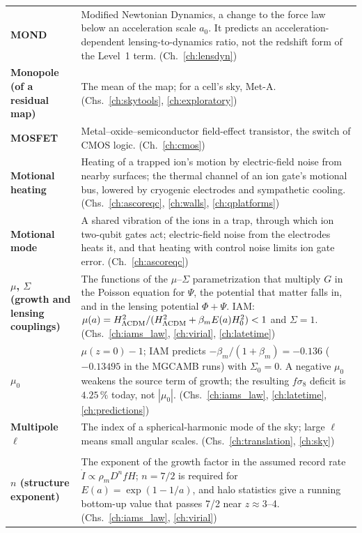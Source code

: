 {\begin{longtable}{@{}>{\raggedright\arraybackslash}p{}>{\raggedright\arraybackslash}p{}@{}}
\textbf{MOND} & Modified Newtonian Dynamics, a change to the force law below an acceleration scale $a_0$. It predicts an acceleration-dependent lensing-to-dynamics ratio, not the redshift form of the Level~1 term. {\footnotesize(Ch.~\ref{ch:lensdyn})}\\[1pt]
\textbf{Monopole (of a residual map)} & The mean of the map; for a cell's sky, Met-A. {\footnotesize(Chs.~\ref{ch:skytools}, \ref{ch:exploratory})}\\[1pt]
\textbf{MOSFET} & Metal--oxide--semiconductor field-effect transistor, the switch of CMOS logic. {\footnotesize(Ch.~\ref{ch:cmos})}\\[1pt]
\textbf{Motional heating} & Heating of a trapped ion's motion by electric-field noise from nearby surfaces; the thermal channel of an ion gate's motional bus, lowered by cryogenic electrodes and sympathetic cooling. {\footnotesize(Chs.~\ref{ch:ascoreqc}, \ref{ch:walls}, \ref{ch:qplatforms})}\\[1pt]
\textbf{Motional mode} & A shared vibration of the ions in a trap, through which ion two-qubit gates act; electric-field noise from the electrodes heats it, and that heating with control noise limits ion gate error. {\footnotesize(Ch.~\ref{ch:ascoreqc})}\\[1pt]
\textbf{$\mu$, $\Sigma$ (growth and lensing couplings)} & The functions of the $\mu$--$\Sigma$ parametrization that multiply $G$ in the Poisson equation for $\Psi$, the potential that matter falls in, and in the lensing potential $\Phi+\Psi$. IAM: $\mu(a)=H^2_{\Lambda\rm CDM}/(H^2_{\Lambda\rm CDM}+\beta_mE(a)H_0^2)<1$ and $\Sigma=1$. {\footnotesize(Chs.~\ref{ch:iams_law}, \ref{ch:virial}, \ref{ch:latetime})}\\[1pt]
\textbf{$\mu_0$} & $\mu(z{=}0)-1$; IAM predicts $-\beta_m/(1+\beta_m)=-0.136$ ($-0.13495$ in the MGCAMB runs) with $\Sigma_0=0$. A negative $\mu_0$ weakens the source term of growth; the resulting $f\sigma_8$ deficit is $4.25\,\%$ today, not $|\mu_0|$. {\footnotesize(Chs.~\ref{ch:iams_law}, \ref{ch:latetime}, \ref{ch:predictions})}\\[1pt]
\textbf{Multipole $\ell$} & The index of a spherical-harmonic mode of the sky; large $\ell$ means small angular scales. {\footnotesize(Chs.~\ref{ch:translation}, \ref{ch:sky})}\\[1pt]
\multicolumn{2}{@{}l}{\normalsize\textbf{N}}\\[2pt]
\textbf{$n$ (structure exponent)} & The exponent of the growth factor in the assumed record rate $\dot I\propto\rho_mD^nfH$; $n=7/2$ is required for $E(a)=\exp(1-1/a)$, and halo statistics give a running bottom-up value that passes 7/2 near $z\approx3$--4. {\footnotesize(Chs.~\ref{ch:iams_law}, \ref{ch:virial})}\\[1pt]

\end{longtable}}
